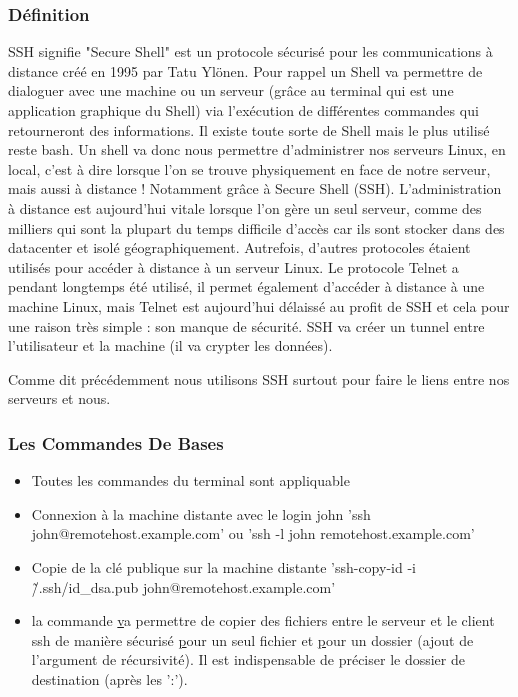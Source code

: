 \subsubsection{Définition}

SSH signifie "Secure Shell" est un protocole sécurisé pour les communications à distance créé en 1995 par Tatu Ylönen. Pour rappel un Shell va permettre de dialoguer avec une machine ou un serveur (grâce au terminal qui est une application graphique du Shell) via l'exécution de différentes commandes qui retourneront des informations. Il existe toute sorte de Shell mais le plus utilisé reste bash.
Un shell va donc nous permettre d'administrer nos serveurs Linux, en local, c'est à dire lorsque l'on se trouve physiquement en face de notre serveur, mais aussi à distance ! Notamment grâce à Secure Shell (SSH).
L'administration à distance est aujourd'hui vitale lorsque l'on gère un seul serveur, comme des milliers qui sont la plupart du temps difficile d'accès car ils sont stocker dans des datacenter et isolé géographiquement.
Autrefois, d'autres protocoles étaient utilisés pour accéder à distance à un serveur Linux. Le protocole Telnet a pendant longtemps été utilisé, il permet également d'accéder à distance à une machine Linux, mais Telnet est aujourd'hui délaissé au profit de SSH et cela pour une raison très simple : son manque de sécurité. SSH va créer un tunnel entre l'utilisateur et la machine (il va crypter les données).

Comme dit précédemment nous utilisons SSH surtout pour faire le liens entre nos serveurs et nous.

\subsubsection{Les Commandes De Bases}
\begin{itemize}
	\item Toutes les commandes du terminal sont appliquable
	\item Connexion à la machine distante avec le login john 'ssh john@remotehost.example.com' ou 'ssh -l john remotehost.example.com'
	\item Copie de la clé publique sur la machine distante 'ssh-copy-id -i \~/.ssh/id\_dsa.pub john@remotehost.example.com'
	\item la commande \href{scp} va permettre de copier des fichiers entre le serveur et le client ssh de manière sécurisé \href{scp my\_file john@remotehost.example.com:/home/john/a\_folder} pour un seul fichier et \href{scp -r my\_folder john@remotehost.example.com:/home/john/another\_folder} pour un dossier (ajout de l’argument de récursivité). Il est indispensable de préciser le dossier de destination (après les ':').
\end{itemize}
